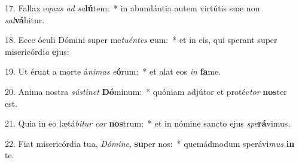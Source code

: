 17. Fallax e\textit{quus} \textit{ad} \textit{sa}\textbf{lú}tem:~*  in abundántia autem virtútis suæ non \textit{sal}\textbf{vá}bitur.\

18. Ecce óculi Dómini super me\textit{tu}\textit{én}\textit{tes} \textbf{e}um:~*  et in eis, qui sperant super misericórdi\textit{a} \textbf{e}jus:\

19. Ut éruat a morte á\textit{ni}\textit{mas} \textit{e}\textbf{ó}rum:~*  et alat eos \textit{in} \textbf{fa}me.\

20. Anima nostra \textit{sús}\textit{ti}\textit{net} \textbf{Dó}minum:~*  quóniam adjútor et protéc\textit{tor} \textbf{nos}ter est.\

21. Quia in eo lætá\textit{bi}\textit{tur} \textit{cor} \textbf{nos}trum:~*  et in nómine sancto ejus \textit{spe}\textbf{rá}vimus.\

22. Fiat misericórdia tua, \textit{Dó}\textit{mi}\textit{ne}, \textbf{su}per nos:~*  quemádmodum sperávi\textit{mus} \textbf{in} te.\

